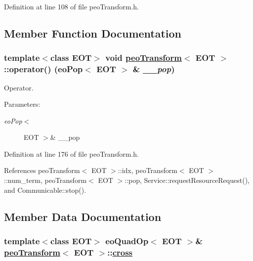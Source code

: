 Definition at line 108 of file peo\-Transform.h.

\subsection{Member Function Documentation}
\hypertarget{classpeoTransform_9322aa28ad272289132e342624a0adb4}{
\subsubsection[operator()]{\setlength{\rightskip}{0pt plus 5cm}template$<$class EOT$>$ void \hyperlink{classpeoTransform}{peo\-Transform}$<$ EOT $>$::operator() (eo\-Pop$<$ EOT $>$ \& {\em \_\-\_\-pop})}}
\label{classpeoTransform_9322aa28ad272289132e342624a0adb4}


Operator. 

\begin{Desc}
\item[Parameters:]
\begin{description}
\item[{\em eo\-Pop$<$}]EOT $>$\& \_\-\_\-pop \end{description}
\end{Desc}


Definition at line 176 of file peo\-Transform.h.

References peo\-Transform$<$ EOT $>$::idx, peo\-Transform$<$ EOT $>$::num\_\-term, peo\-Transform$<$ EOT $>$::pop, Service::request\-Resource\-Request(), and Communicable::stop().

\subsection{Member Data Documentation}
\hypertarget{classpeoTransform_d2fce5199b61f599fd89cf54d6fcd312}{
\subsubsection[cross]{\setlength{\rightskip}{0pt plus 5cm}template$<$class EOT$>$ eo\-Quad\-Op$<$ EOT $>$\& \hyperlink{classpeoTransform}{peo\-Transform}$<$ EOT $>$::\hyperlink{classpeoTransform_d2fce5199b61f599fd89cf54d6fcd312}{cross}}}
\label{classpeoTransform_d2fce5199b61f599fd89cf54d6fcd312}


